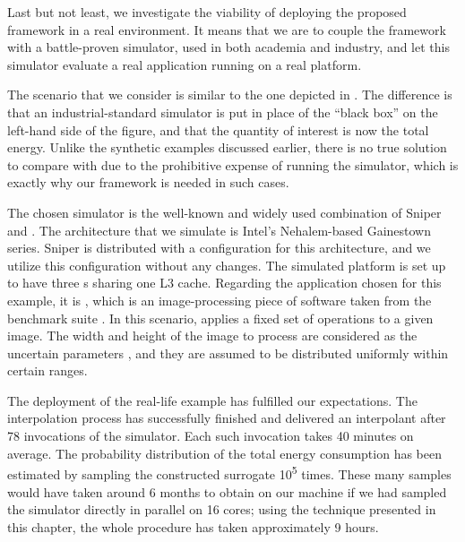 Last but not least, we investigate the viability of deploying the proposed
framework in a real environment. It means that we are to couple the framework
with a battle-proven simulator, used in both academia and industry, and let this
simulator evaluate a real application running on a real platform.

The scenario that we consider is similar to the one depicted in
. The difference is that an industrial-standard
simulator is put in place of the ``black box'' on the left-hand side of the
figure, and that the quantity of interest \g is now the total energy. Unlike the
synthetic examples discussed earlier, there is no true solution to compare with
due to the prohibitive expense of running the simulator, which is exactly why
our framework is needed in such cases.

The chosen simulator is the well-known and widely used combination of Sniper
\cite{carlson2011} and  \cite{li2009}. The architecture that we
simulate is Intel's Nehalem-based Gainestown series. Sniper is distributed with
a configuration for this architecture, and we utilize this configuration without
any changes. The simulated platform is set up to have three s sharing
one L3 cache. Regarding the application chosen for this example, it is
, which is an image-processing piece of software taken from the
 benchmark suite \cite{bienia2011}. In this scenario, 
applies a fixed set of operations to a given image. The width and height of the
image to process are considered as the uncertain parameters \vu, and they are
assumed to be distributed uniformly within certain ranges.

The deployment of the real-life example has fulfilled our expectations. The
interpolation process has successfully finished and delivered an interpolant
after 78 invocations of the simulator. Each such invocation takes 40 minutes on
average. The probability distribution of the total energy consumption has been
estimated by sampling the constructed surrogate 10\textsuperscript{5} times.
These many samples would have taken around 6 months to obtain on our machine if
we had sampled the simulator directly in parallel on 16 cores; using the
technique presented in this chapter, the whole procedure has taken approximately
9 hours.
